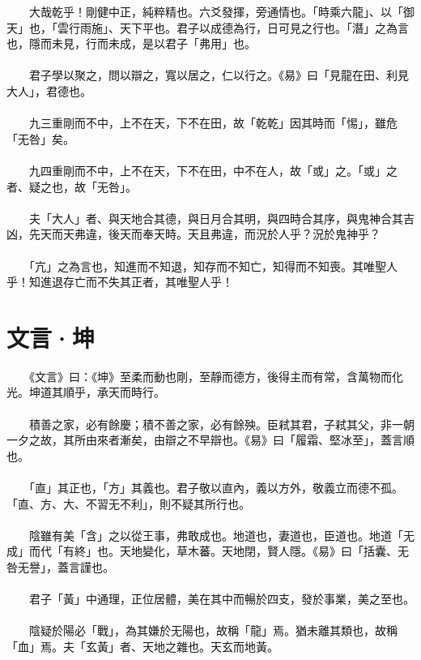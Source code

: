 　　大哉乾乎！剛健中正，純粹精也。六爻發揮，旁通情也。「時乘六龍」、以「御天」也，「雲行雨施」、天下平也。君子以成德為行，日可見之行也。「潛」之為言也，隱而未見，行而未成，是以君子「弗用」也。
\\\\
　　君子學以聚之，問以辯之，寬以居之，仁以行之。《易》曰「見龍在田、利見大人」，君德也。
\\\\
　　九三重剛而不中，上不在天，下不在田，故「乾乾」因其時而「惕」，雖危「无咎」矣。
\\\\
　　九四重剛而不中，上不在天，下不在田，中不在人，故「或」之。「或」之者、疑之也，故「无咎」。
\\\\
　　夫「大人」者、與天地合其德，與日月合其明，與四時合其序，與鬼神合其吉凶，先天而天弗違，後天而奉天時。天且弗違，而況於人乎？況於鬼神乎？
\\\\
　　「亢」之為言也，知進而不知退，知存而不知亡，知得而不知喪。其唯聖人乎！知進退存亡而不失其正者，其唯聖人乎！

\section{文言·坤}

　　《文言》曰：《坤》至柔而動也剛，至靜而德方，後得主而有常，含萬物而化光。坤道其順乎，承天而時行。
\\\\
　　積善之家，必有餘慶；積不善之家，必有餘殃。臣弒其君，子弒其父，非一朝一夕之故，其所由來者漸矣，由辯之不早辯也。《易》曰「履霜、堅冰至」，蓋言順也。
\\\\
　　「直」其正也，「方」其義也。君子敬以直內，義以方外，敬義立而德不孤。「直、方、大、不習无不利」，則不疑其所行也。
\\\\
　　陰雖有美「含」之以從王事，弗敢成也。地道也，妻道也，臣道也。地道「无成」而代「有終」也。天地變化，草木蕃。天地閉，賢人隱。《易》曰「括囊、无咎无譽」，蓋言謹也。
\\\\
　　君子「黃」中通理，正位居體，美在其中而暢於四支，發於事業，美之至也。
\\\\
　　陰疑於陽必「戰」，為其嫌於无陽也，故稱「龍」焉。猶未離其類也，故稱「血」焉。夫「玄黃」者、天地之雜也。天玄而地黃。